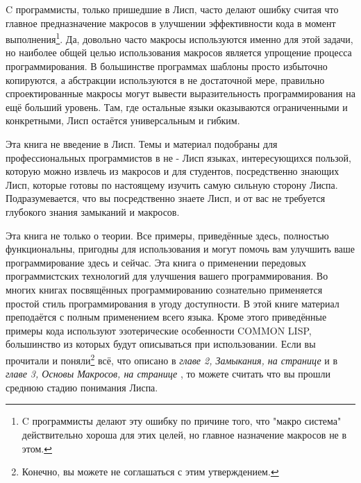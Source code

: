 C программисты, только пришедшие в Лисп, часто делают ошибку считая что главное предназначение макросов в улучшении эффективности кода в момент выполнения\footnote{C программисты делают эту ошибку по причине того, что "макро система" действительно хороша для этих целей, но главное назначение макросов не в этом.}. Да, довольно часто макросы используются именно для этой задачи, но наиболее общей целью использования макросов является упрощение процесса программирования. В большинстве программах шаблоны просто избыточно копируются, а абстракции используются в не достаточной мере, правильно спроектированные макросы могут вывести выразительность программирования на ещё больший уровень. Там, где остальные языки оказываются ограниченными и конкретными, Лисп остаётся универсальным и гибким.

Эта книга не введение в Лисп. Темы и материал подобраны для профессиональных программистов в не - Лисп языках, интересующихся пользой, которую можно извлечь из макросов и для студентов, посредственно знающих Лисп, которые готовы по настоящему изучить самую сильную сторону Лиспа. Подразумевается, что вы посредственно знаете Лисп, и от вас не требуется глубокого знания замыканий и макросов.

Эта книга не только о теории. Все примеры, приведённые здесь, полностью функциональны, пригодны для использования и могут помочь вам улучшить ваше программирование здесь и сейчас. Эта книга о применении передовых программистских технологий для улучшения вашего программирования. Во многих книгах посвящённых программированию сознательно применяется простой стиль программирования в угоду доступности. В этой книге материал преподаётся с полным применением всего языка. Кроме этого приведённые примеры кода используют эзотерические особенности COMMON LISP, большинство из которых будут описываться при использовании. Если вы прочитали и поняли\footnote{Конечно, вы можете не соглашаться с этим утверждением.} всё, что описано в \emph{главе 2, Замыкания, на странице \pageref{chapter_closures}} и в \emph{главе 3, Основы Макросов, на странице \pageref{chapter_macro_basics}}, то можете считать что вы прошли среднюю стадию понимания Лиспа.

